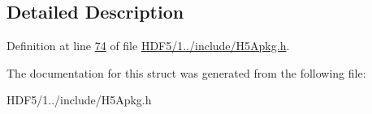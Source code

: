 \subsection{Detailed Description}


Definition at line \hyperlink{_h_d_f5_21_810_81_2include_2_h5_apkg_8h_source_l00074}{74} of file \hyperlink{_h_d_f5_21_810_81_2include_2_h5_apkg_8h_source}{H\+D\+F5/1../include/\+H5\+Apkg.\+h}.



The documentation for this struct was generated from the following file\+:\begin{DoxyCompactItemize}
\item 
H\+D\+F5/1../include/\+H5\+Apkg.\+h\end{DoxyCompactItemize}
